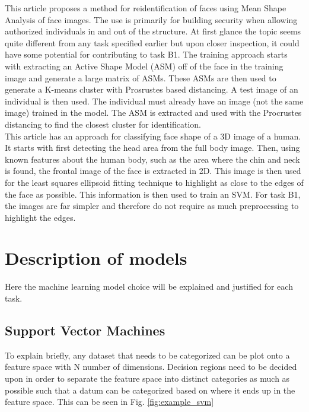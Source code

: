 \documentclass{article}
\begin{document}
	This article \cite{8227986} proposes a method for reidentification of faces using Mean Shape Analysis of face images. The use is primarily for building security when allowing authorized individuals in and out of the structure. At first glance the topic seems quite different from any task specified earlier but upon closer inspection, it could have some potential for contributing to task B1. The training approach starts with extracting an Active Shape Model (ASM) off of the face in the training image and generate a large matrix of ASMs. These ASMs are then used to generate a K-means cluster with Prosrustes based distancing. A test image of an individual is then used. The individual must already have an image (not the same image) trained in the model. The ASM is extracted and used with the Procrustes distancing to find the closest cluster for identification.\\
	
	This article \cite{7017382} has an approach for classifying face shape of a 3D image of a human. It starts with first detecting the head area from the full body image. Then, using known features about the human body, such as the area where the chin and neck is found, the frontal image of the face is extracted in 2D. This image is then used for the least squares ellipsoid fitting technique to highlight as close to the edges of the face as possible. This information is then used to train an SVM. For task B1, the images are far simpler and therefore do not require as much preprocessing to highlight the edges.  
\section{Description of models}
\label{sec:models}
    Here the machine learning model choice will be explained and justified for each task. 
    
    \subsection{Support Vector Machines}
    To explain briefly, any dataset that needs to be categorized can be plot onto a feature space with N number of dimensions. Decision regions need to be decided upon in order to separate the feature space into distinct categories as much as possible such that a datum can be categorized based on where it ends up in the feature space. This can be seen in Fig. \ref{fig:example_svm}
    
\end{document}

